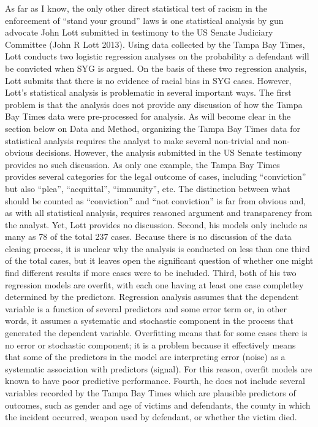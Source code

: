 \documentclass[12pt,article]{article}
\begin{document}
As far as I know, the only other direct statistical test of racism in
the enforcement of ``stand your ground'' laws is one statistical
analysis by gun advocate John Lott submitted in testimony to the US
Senate Judiciary Committee (John R Lott 2013). Using data collected by
the Tampa Bay Times, Lott conducts two logistic regression analyses on
the probability a defendant will be convicted when SYG is argued. On the
basis of these two regression analysis, Lott submits that there is no
evidence of racial bias in SYG cases. However, Lott's statistical
analysis is problematic in several important ways. The first problem is
that the analysis does not provide any discussion of how the Tampa Bay
Times data were pre-processed for analysis. As will become clear in the
section below on Data and Method, organizing the Tampa Bay Times data
for statistical analysis requires the analyst to make several
non-trivial and non-obvious decisions. However, the analysis submitted
in the US Senate testimony provides no such discussion. As only one
example, the Tampa Bay Times provides several categories for the legal
outcome of cases, including ``conviction'' but also ``plea'',
``acquittal'', ``immunity'', etc. The distinction between what should be
counted as ``conviction'' and ``not conviction'' is far from obvious
and, as with all statistical analysis, requires reasoned argument and
transparency from the analyst. Yet, Lott provides no discussion. Second,
his models only include as many as 78 of the total 237 cases. Because
there is no discussion of the data cleaing process, it is unclear why
the analysis is conducted on less than one third of the total cases, but
it leaves open the significant question of whether one might find
different results if more cases were to be included. Third, both of his
two regression models are overfit, with each one having at least one
case completley determined by the predictors. Regression analysis
assumes that the dependent variable is a function of several predictors
and some error term or, in other words, it assumes a systematic and
stochastic component in the process that generated the dependent
variable. Overfitting means that for some cases there is no error or
stochastic component; it is a problem because it effectively means that
some of the predictors in the model are interpreting error (noise) as a
systematic association with predictors (signal). For this reason,
overfit models are known to have poor predictive performance. Fourth, he
does not include several variables recorded by the Tampa Bay Times which
are plausible predictors of outcomes, such as gender and age of victims
and defendants, the county in which the incident occurred, weapon used
by defendant, or whether the victim died.
\end{document}
